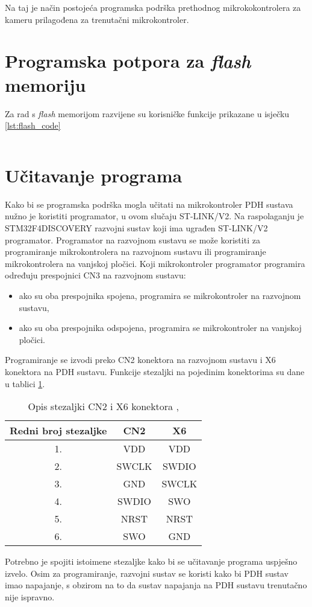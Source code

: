 Na taj je način postojeća programska podrška prethodnog mikrokokontrolera za kameru prilagođena za trenutačni mikrokontroler.

\section{Programska potpora za \textit{flash} memoriju}

Za rad s \textit{flash} memorijom razvijene su korisničke funkcije prikazane u isječku \ref{lst:flash_code}

\begin{lstlisting}[caption=Korisničke funkcije za \textit{flash} memoriju, label={lst:flash_code}]
\end{lstlisting}

\section{Učitavanje programa}

Kako bi se programska podrška mogla učitati na mikrokontroler PDH sustava nužno je koristiti programator, u ovom slučaju ST-LINK/V2. Na raspolaganju je \\ STM32F4DISCOVERY razvojni sustav koji ima ugrađen ST-LINK/V2 programator. Programator na razvojnom sustavu se može koristiti za programiranje mikrokontrolera na razvojnom sustavu ili programiranje mikrokontrolera na vanjskoj pločici. Koji mikrokontroler programator programira određuju prespojnici CN3 na razvojnom sustavu:
\begin{itemize}
	\item ako su oba prespojnika spojena, programira se mikrokontroler na razvojnom sustavu,
	\item ako su oba prespojnika odspojena, programira se mikrokontroler na vanjskoj pločici.
\end{itemize}
Programiranje se izvodi preko CN2 konektora na razvojnom sustavu i X6 konektora na PDH sustavu. Funkcije stezaljki na pojedinim konektorima su dane u tablici \ref{Tab:conn_func}.
\begin{center}
	\begin{table}[H]
		\centering
		\caption{Opis stezaljki CN2 i X6 konektora \cite{zavrsni_filip_juric}, \cite{disc_manual}}
		\begin{tabular}{| c | c | c |}
			\hline
			Redni broj stezaljke & CN2 & X6 \\
			\hline
			1. & VDD & VDD \\
			\hline
			2. & SWCLK & SWDIO \\
			\hline
			3. & GND & SWCLK \\
			\hline
			4. & SWDIO & SWO \\
			\hline
			5. & NRST & NRST \\
			\hline
			6. & SWO & GND \\
			\hline
		\end{tabular}
		\label{Tab:conn_func}
	\end{table}
\end{center}
Potrebno je spojiti istoimene stezaljke kako bi se učitavanje programa uspješno izvelo. Osim za programiranje, razvojni sustav se koristi kako bi PDH sustav imao napajanje, s obzirom na to da sustav napajanja na PDH sustavu trenutačno nije ispravno.